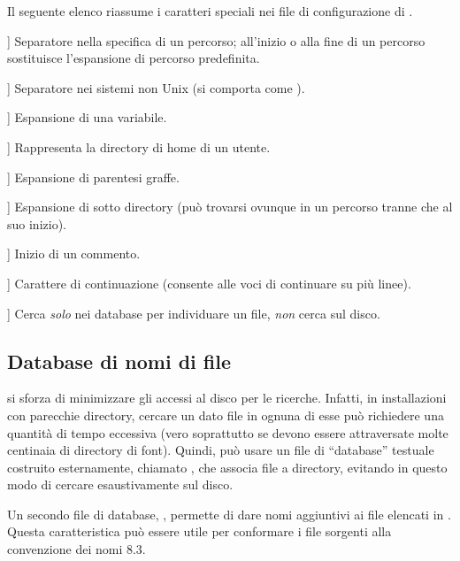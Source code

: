 \documentclass{article}
\begin{document}
Il seguente elenco riassume i caratteri speciali nei file di
configurazione di \KPS{}.

\newcommand{\CODE}[1]{\makebox[3em][l]{\code{#1}}}
\begin{ttdescription}
\item[\CODE{:}] Separatore nella specifica di un percorso; all'inizio o
  alla fine di un percorso sostituisce l'espansione di percorso
  predefinita.\par
\item[\CODE{;}] Separatore nei sistemi non Unix (si comporta come
  \code{:}).
\item[\CODE{\$}] Espansione di una variabile.
\item[\CODE{\string~}] Rappresenta la directory di home di un utente.
\item[\CODE{\char`\{...\char`\}}] Espansione di parentesi graffe.
\item[\CODE{//}] Espansione di sotto directory (può trovarsi ovunque in un
  percorso tranne che al suo inizio).
\item[\CODE{\%}] Inizio di un commento.
\item[\CODE{\bs}] Carattere di continuazione (consente alle voci di
  continuare su più linee).
\item[\CODE{!!}] Cerca \emph{solo} nei database per individuare un file,
    \emph{non} cerca sul disco.
\end{ttdescription}


\subsection{Database di nomi di file}
\label{sec:filename-database}

\KPS{} si sforza di minimizzare gli accessi al disco per le ricerche.
Infatti, in installazioni con parecchie directory, cercare un dato file
in ognuna di esse può richiedere una quantità di tempo eccessiva (vero
soprattutto se devono essere attraversate molte centinaia di directory di
font). Quindi, \KPS{} può usare un file di ``database'' testuale costruito
esternamente, chiamato , che associa file a directory, evitando
in questo modo di cercare esaustivamente sul disco.

Un secondo file di database, , permette di dare nomi
aggiuntivi ai file elencati in . Questa caratteristica può
essere utile per conformare i file sorgenti alla convenzione dei nomi
 8.3.
\end{document}
